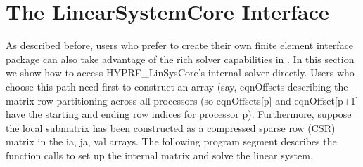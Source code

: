 \section{The LinearSystemCore Interface}

As described before, users who prefer to create their own finite element
interface package can also take advantage of the rich solver capabilities
in \hypre{}. In this section we show how to access {\sf HYPRE\_LinSysCore}'s
internal solver directly.  Users who choose this path need first to 
construct an array (say, {\sf eqnOffsets} describing the matrix row
partitioning across all processors (so {\sf eqnOffsets[p]} and
{\sf eqnOffset[p+1]} have the starting and ending row indices for processor
p). Furthermore, suppose the local submatrix has been constructed as a
compressed sparse row (CSR) matrix in the {\sf ia, ja, val} arrays. 
The following program segment describes the function calls to set up
the internal matrix and solve the linear system.

